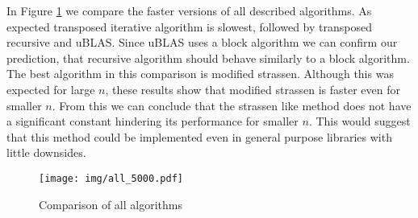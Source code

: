 \documentclass[a4paper,11pt]{article}
\begin{document}
In Figure \ref{fig:all_algorithms} we compare the faster versions of all described algorithms. As expected transposed iterative algorithm is slowest, followed by transposed recursive and uBLAS. Since uBLAS uses a block algorithm we can confirm our prediction, that recursive algorithm should behave similarly to a block algorithm. The best algorithm in this comparison is modified strassen. Although this was expected for large $n$, these results show that modified strassen is faster even for smaller $n$. From this we can conclude that the strassen like method does not have a significant constant hindering its performance for smaller $n$. This would suggest that this method could be implemented even in general purpose libraries with little downsides.

\begin{figure}[h]
\centering
\texttt{[image: img/all\_5000.pdf]}
\caption{Comparison of all algorithms}
\label{fig:all_algorithms}
\end{figure}
\end{document}
